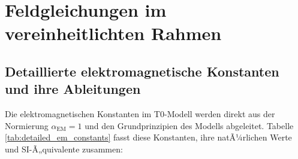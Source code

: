 ﻿\documentclass[twocolumn,aps,prl]{revtex4-2}
\begin{document}
{{{{{{{{{											\section{Feldgleichungen im vereinheitlichten Rahmen}
											\label{sec:field_equations}
											
											\subsection{Detaillierte elektromagnetische Konstanten und ihre Ableitungen}
											\label{subsec:detailed_em_constants}
											
											Die elektromagnetischen Konstanten im T0-Modell werden direkt aus der Normierung \(\alpha_{\text{EM}} = 1\) und den Grundprinzipien des Modells abgeleitet. Tabelle \ref{tab:detailed_em_constants} fasst diese Konstanten, ihre natÃ¼rlichen Werte und SI-Ã„quivalente zusammen:
											
}}}}}}}}}
\end{document}
